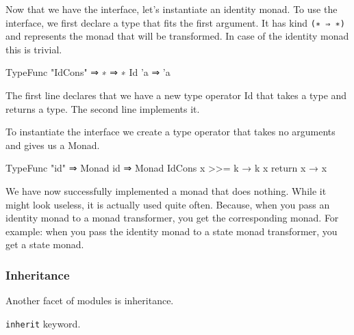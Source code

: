 \begin{multicols}{2}
  \noindent
  Now that we have the interface, let's instantiate an identity monad.
  To use the interface, we first declare a type that fits the first argument.
  It has kind \texttt{(∗ ⇒ ∗)} and represents the monad that will be transformed.
  In case of the identity monad this is trivial.

  \begin{code}
  TypeFunc "IdCons" ⇒ ∗ ⇒ ∗
  Id 'a ⇒ 'a
  \end{code}

  \noindent
  The first line declares that we have a new type operator Id that takes a type and returns a type.
  The second line implements it. 

  To instantiate the interface we create a type operator that takes no arguments and gives us a Monad.
  
  \begin{code}
  TypeFunc "id" ⇒ Monad 
  id ⇒ Monad IdCons {
    x >>= k → k x
    return x → x
  }
  \end{code}

  We have now successfully implemented a monad that does nothing.
  While it might look useless, it is actually used quite often.
  Because, when you pass an identity monad to a monad transformer, you get the corresponding monad.
  For example: when you pass the identity monad to a state monad transformer, you get a state monad.
  
  \subsubsection*{Inheritance}
  Another facet of modules is inheritance.
  
  \texttt{inherit} keyword.
  
\end{multicols}
